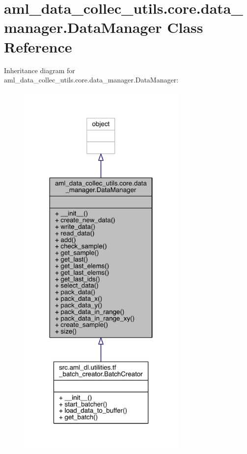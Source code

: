 \hypertarget{classaml__data__collec__utils_1_1core_1_1data__manager_1_1_data_manager}{}\section{aml\+\_\+data\+\_\+collec\+\_\+utils.\+core.\+data\+\_\+manager.\+Data\+Manager Class Reference}
\label{classaml__data__collec__utils_1_1core_1_1data__manager_1_1_data_manager}


Inheritance diagram for aml\+\_\+data\+\_\+collec\+\_\+utils.\+core.\+data\+\_\+manager.\+Data\+Manager\+:\nopagebreak
\begin{figure}[H]
\begin{center}
\leavevmode
\includegraphics[width=236pt]{classaml__data__collec__utils_1_1core_1_1data__manager_1_1_data_manager__inherit__graph}
\end{center}
\end{figure}


